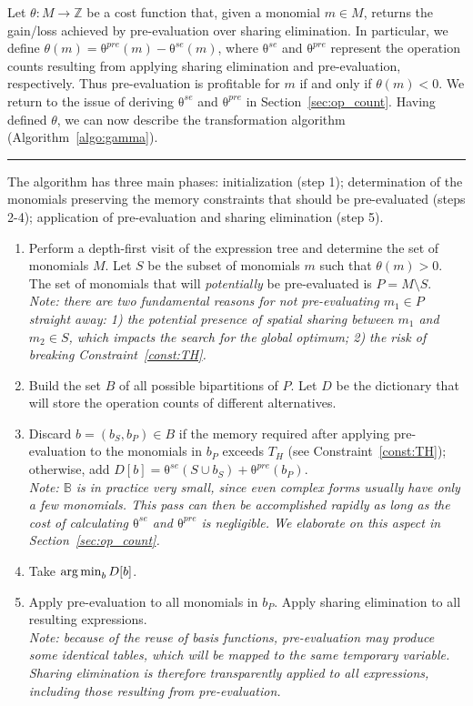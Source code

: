 Let $\theta : M \rightarrow \mathbb{Z}$ be a cost function that, given a monomial $m \in M$, returns the gain/loss achieved by pre-evaluation over sharing elimination. In particular, we define $\theta(m) = \mathrm{\theta}^{pre}(m) - \mathrm{\theta}^{se}(m)$, where $\mathrm{\theta}^{se}$ and $\mathrm{\theta}^{pre}$ represent the operation counts resulting from applying sharing elimination and pre-evaluation, respectively. Thus pre-evaluation is profitable for $m$ if and only if $\theta(m) < 0$. We return to the issue of deriving $\mathrm{\theta}^{se}$ and $\mathrm{\theta}^{pre}$ in Section~\ref{sec:op_count}. Having defined $\theta$, we can now describe the transformation algorithm (Algorithm~\ref{algo:gamma}).

\noindent\rule[0.01ex]{\linewidth}{0.7pt}

\begin{Algo}
\label{algo:gamma}
\normalfont
The algorithm has three main phases: initialization (step 1); determination of the monomials preserving the memory constraints that should be pre-evaluated (steps 2-4); application of pre-evaluation and sharing elimination (step 5).
\begin{enumerate}
\item Perform a depth-first visit of the expression tree and determine the set of monomials $M$. Let $S$ be the subset of monomials $m$ such that $\theta(m) > 0$. The set of monomials that will \textit{potentially} be pre-evaluated is $P = M \setminus S$. \\ \textit{Note: there are two fundamental reasons for not pre-evaluating $m_1 \in P$ straight away: 1) the potential presence of spatial sharing between $m_1$ and $m_2 \in S$, which impacts the search for the global optimum; 2) the risk of breaking Constraint~\ref{const:TH}.}
\item Build the set $B$ of all possible bipartitions of $P$. Let $D$ be the dictionary that will store the operation counts of different alternatives.
\item Discard $b = (b_S, b_P) \in B$ if the memory required after applying pre-evaluation to the monomials in $b_P$ exceeds $T_H$ (see Constraint~\ref{const:TH}); otherwise, add $D[b] = \mathrm{\theta}^{se}(S \cup b_S) + \mathrm{\theta}^{pre}(b_P)$. \\ \textit{Note: $\mathbb{B}$ is in practice very small, since even complex forms usually have only a few monomials. This pass can then be accomplished rapidly as long as the cost of calculating $\mathrm{\theta}^{se}$ and $\mathrm{\theta}^{pre}$ is negligible. We elaborate on this aspect in Section~\ref{sec:op_count}.}
\item Take $\operatorname*{arg\,min}_b D[b]$.
\item Apply pre-evaluation to all monomials in $b_P$. Apply sharing elimination to all resulting expressions. \\ \textit{Note: because of the reuse of basis functions, pre-evaluation may produce some identical tables, which will be mapped to the same temporary variable. Sharing elimination is therefore transparently applied to all expressions, including those resulting from pre-evaluation.}
\end{enumerate}
\end{Algo}

